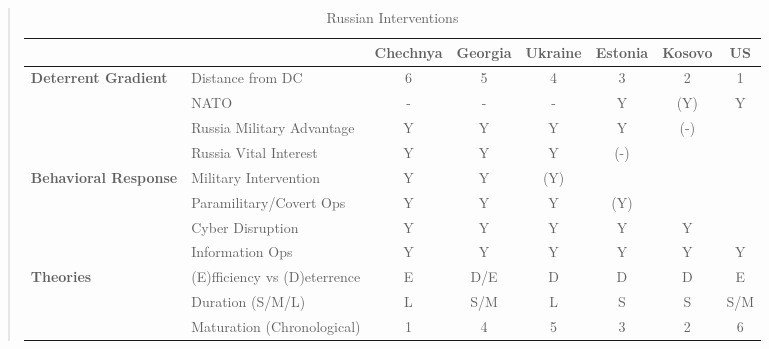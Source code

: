 \documentclass[12pt,letterpaper]{article}
\begin{document}
	\begin{quote}
	\begin{table}[H]
	\caption{Russian Interventions}
	\label{fig_losg}
	\begin{adjustbox}{width=1.2\textwidth,center=\textwidth}
		\begin{tabular}{|l|l|cccccc|}
			\hline
			 & & \textbf{Chechnya} & \textbf{Georgia} & \textbf{Ukraine} & \textbf{Estonia} & \textbf{Kosovo} & \textbf{US} \\
			\hline
			\multirow{4}{*}{\textbf{Deterrent Gradient}}
			& Distance from DC & 6 & 5 & 4 & 3 & 2 & 1 \\
			& NATO & - & - & - & Y & (Y) & Y \\
			& Russia Military Advantage & Y & Y & Y & Y & (-) & \\
			& Russia Vital Interest & Y & Y & Y & (-) &  &  \\
			\hline
			\multirow{4}{*}{\textbf{Behavioral Response}}
			& Military Intervention & Y & Y & (Y) &  &  &  \\
			& Paramilitary/Covert Ops & Y & Y & Y & (Y) &  &  \\
			& Cyber Disruption & Y & Y & Y & Y & Y &  \\
			& Information Ops & Y & Y & Y & Y & Y & Y \\
			\hline
			\multirow{3}{*}{\textbf{Theories}}
			& (E)fficiency vs (D)eterrence & E & D/E & D & D & D & E \\
			& Duration (S/M/L) & L & S/M & L & S & S & S/M \\
			& Maturation (Chronological) & 1 & 4 & 5 & 3 & 2 & 6 \\
			\hline
		\end{tabular}
	\end{adjustbox}
	\end{table}
	\end{quote}
\end{document}
